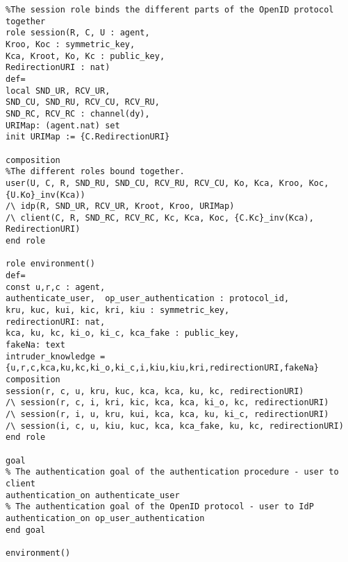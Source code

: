 \begin{lstlisting}
%The session role binds the different parts of the OpenID protocol together
role session(R, C, U : agent,
Kroo, Koc : symmetric_key,
Kca, Kroot, Ko, Kc : public_key,
RedirectionURI : nat)
def=
local SND_UR, RCV_UR,	
SND_CU, SND_RU, RCV_CU, RCV_RU,
SND_RC, RCV_RC : channel(dy),
URIMap: (agent.nat) set
init URIMap := {C.RedirectionURI}

composition
%The different roles bound together.
user(U, C, R, SND_RU, SND_CU, RCV_RU, RCV_CU, Ko, Kca, Kroo, Koc,{U.Ko}_inv(Kca))
/\ idp(R, SND_UR, RCV_UR, Kroot, Kroo, URIMap)
/\ client(C, R, SND_RC, RCV_RC, Kc, Kca, Koc, {C.Kc}_inv(Kca), RedirectionURI)
end role

role environment()
def=
const u,r,c : agent,
authenticate_user,  op_user_authentication : protocol_id,
kru, kuc, kui, kic, kri, kiu : symmetric_key,
redirectionURI: nat,
kca, ku, kc, ki_o, ki_c, kca_fake : public_key,
fakeNa: text
intruder_knowledge = {u,r,c,kca,ku,kc,ki_o,ki_c,i,kiu,kiu,kri,redirectionURI,fakeNa}
composition
session(r, c, u, kru, kuc, kca, kca, ku, kc, redirectionURI)
/\ session(r, c, i, kri, kic, kca, kca, ki_o, kc, redirectionURI)
/\ session(r, i, u, kru, kui, kca, kca, ku, ki_c, redirectionURI)
/\ session(i, c, u, kiu, kuc, kca, kca_fake, ku, kc, redirectionURI)
end role

goal
% The authentication goal of the authentication procedure - user to client
authentication_on authenticate_user
% The authentication goal of the OpenID protocol - user to IdP
authentication_on op_user_authentication
end goal

environment()
\end{lstlisting}